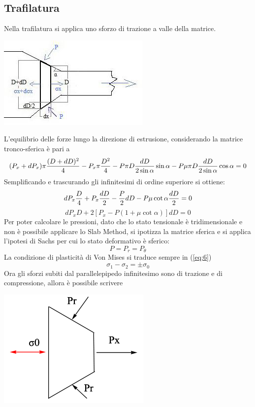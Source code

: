 \documentclass[a4paper, 15pt]{article}
\begin{document}
	\subsection{Trafilatura}
	Nella trafilatura si applica uno sforzo di trazione a valle della matrice.
\begin{center}
	\includegraphics[width=0.5\linewidth]{figures/def12}
\end{center}
	L'equilibrio delle forze lungo la direzione di estrusione, considerando la matrice tronco-sferica è pari a
	\[(P_x+dP_x)\pi\dfrac{(D+dD)^2}{4} - P_x\pi{D^2\over4} - P\pi D\dfrac{dD}{2\sin\alpha}\sin\alpha-P\mu\pi D\dfrac{dD}{2\sin\alpha}\cos\alpha=0\]
	Semplificando e trascurando gli infinitesimi di ordine superiore si ottiene:
	\[dP_x{D\over4} + P_x{dD\over2}-{P\over2}dD - P\mu\cot\alpha{dD\over2} = 0\]
	\begin{equation}\label{eq:8}
		dP_xD + 2[P_x-P(1+\mu\cot\alpha)]dD=0
	\end{equation}
	Per poter calcolare le pressioni, dato che lo stato tensionale è tridimensionale e non è possibile applicare lo Slab Method, si ipotizza la matrice sferica e si applica l'ipotesi di Sachs per cui lo stato deformativo è sferico:
	\[P = P_r = P_\theta\]
	La condizione di plasticità di Von Mises si traduce sempre in (\ref{eq:6})
	\[\sigma_1-\sigma_2 = \pm\sigma_0\]
	Ora gli sforzi subiti dal parallelepipedo infinitesimo sono di trazione e di compressione, allora è possibile scrivere
	\begin{center}
		\includegraphics[width=0.5\linewidth]{figures/def12.1}
	\end{center}
\end{document}
